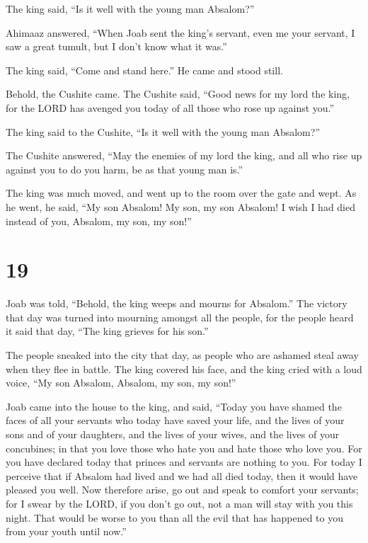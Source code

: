  The king said, ``Is it well with the young man Absalom?''

Ahimaaz answered, ``When Joab sent the king's servant, even me your
servant, I saw a great tumult, but I don't know what it was.''

 The king said, ``Come and stand here.'' He came and stood
still.

 Behold, the Cushite came. The Cushite said, ``Good news
for my lord the king, for the LORD has avenged you today of all those
who rose up against you.''

 The king said to the Cushite, ``Is it well with the young
man Absalom?''

The Cushite answered, ``May the enemies of my lord the king, and all who
rise up against you to do you harm, be as that young man is.''

 The king was much moved, and went up to the room over the
gate and wept. As he went, he said, ``My son Absalom! My son, my son
Absalom! I wish I had died instead of you, Absalom, my son, my son!''

\hypertarget{section-18}{%
\section{19}\label{section-18}}

 Joab was told, ``Behold, the king weeps and mourns for
Absalom.''  The victory that day was turned into mourning
amongst all the people, for the people heard it said that day, ``The
king grieves for his son.''

 The people sneaked into the city that day, as people who
are ashamed steal away when they flee in battle.  The king
covered his face, and the king cried with a loud voice, ``My son
Absalom, Absalom, my son, my son!''

 Joab came into the house to the king, and said, ``Today you
have shamed the faces of all your servants who today have saved your
life, and the lives of your sons and of your daughters, and the lives of
your wives, and the lives of your concubines;  in that you
love those who hate you and hate those who love you. For you have
declared today that princes and servants are nothing to you. For today I
perceive that if Absalom had lived and we had all died today, then it
would have pleased you well.  Now therefore arise, go out
and speak to comfort your servants; for I swear by the LORD, if you
don't go out, not a man will stay with you this night. That would be
worse to you than all the evil that has happened to you from your youth
until now.''

